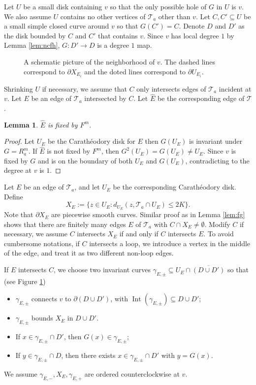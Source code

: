 \documentclass[11pt, reqno]{amsart}
\newcommand{\incfig}[1]{%
    \def\svgwidth{\columnwidth}
    {#1.pdf_tex}
}
\numberwithin{equation}{section}
\theoremstyle{plain}
\theoremstyle{theorem}
\newtheorem{lem}[theorem]{Lemma}
\theoremstyle{definition}
\newcommand{\T}{\mathcal{T}}
\DeclareMathOperator{\Int}{Int}
\numberwithin{figure}{section}
\begin{document}
Let $U$ be a small disk containing $v$ so that the only possible hole of $G$ in $U$ is $v$. 
We also assume $U$ contains no other vertices of $\T_a$ other than $v$.
Let $C, C' \subseteq U$ be a small simple closed curve around $v$ so that $G (C') = C$.
Denote $D$ and $D'$ as the disk bounded by $C$ and $C'$ that contains $v$.
Since $v$ has local degree $1$ by Lemma \ref{lem:ncfh}, $G: D' \longrightarrow D$ is a degree $1$ map.

\begin{figure}[ht]
  \centering
  \resizebox{0.8\linewidth}{!}{
  \incfig{NHV}
  }
  \caption{A schematic picture of the neighborhood of $v$. The dashed lines correspond to $\partial X_{E_i}$ and the doted lines correspond to $\partial U_{E_i}$.}
  \label{fig:NHV}
\end{figure}

Shrinking $U$ if necessary, we assume that $C$ only intersects edges of $\T_a$ incident at $v$.
Let $E$ be an edge of $\T_a$ intersected by $C$. 
Let $\hat E$ be the corresponding edge of $\mathcal{T}$.
\begin{lem}\label{lem:IEP}
$\hat E$ is fixed by $F^m$.
\end{lem}
\begin{proof}
Let $U_E$ be the Carath\'eodory disk for $E$ then $G(U_{E})$ is invariant under $G = R_a^m$.
If $\hat E$ is not fixed by $F^m$, then $G^2(U_E) = G(U_E) \neq U_E$.
Since $v$ is fixed by $G$ and is on the boundary of both $U_{E}$ and $G(U_{E})$, contradicting to the degree at $v$ is $1$.
\end{proof}


Let $E$ be an edge of $\T_{a}$, and let $U_E$ be the corresponding Carath\'eodory disk.
Define 
$$
X_E:=\{z\in U_E: d_{U_E}(z, \T_{a} \cap U_E) \leq 2K\}.
$$
Note that $\partial X_E$ are piecewise smooth curves.
Similar proof as in Lemma \ref{lem:fg} shows that there are finitely many edges $E$ of $\T_{a}$ with $C \cap X_E \neq \emptyset$.
Modify $C$ if necessary, we assume $C$ intersects $X_E$ if and only if $C$ intersects $E$.
To avoid cumbersome notations, if $C$ intersects a loop, we introduce a vertex in the middle of the edge, and treat it as two different non-loop edges.

If $E$ intersects $C$, we choose two invariant curves $\gamma_{E, \pm} \subseteq U_E\cap \overline{(D \cup D')}$ so that (see Figure \ref{fig:NHV})
\begin{itemize}
\item $\gamma_{E, \pm}$ connects $v$ to $\partial (D \cup D')$, with $\Int(\gamma_{E, \pm}) \subseteq D \cup D'$;
\item $\gamma_{E, \pm}$ bounds $X_E$ in $D \cup D'$.
\item If $x\in \gamma_{E, \pm} \cap D'$, then $G(x)\in \gamma_{E, \pm}$;
\item If $y\in \gamma_{E, \pm} \cap D$, then there exists $x \in \gamma_{E, \pm} \cap D'$ with $y = G(x)$.
\end{itemize}
We assume $\gamma_{E, -}, X_E, \gamma_{E, +}$ are ordered counterclockwise at $v$.
\end{document}
